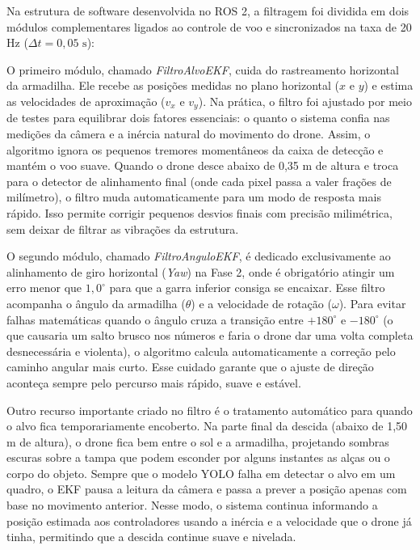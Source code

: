 Na estrutura de software desenvolvida no ROS 2, a filtragem foi dividida em dois módulos complementares ligados ao controle de voo e sincronizados na taxa de 20 Hz ($\Delta t = 0,05\text{ s}$):

O primeiro módulo, chamado \textit{FiltroAlvoEKF}, cuida do rastreamento horizontal da armadilha. Ele recebe as posições medidas no plano horizontal ($x$ e $y$) e estima as velocidades de aproximação ($v_x$ e $v_y$). Na prática, o filtro foi ajustado por meio de testes para equilibrar dois fatores essenciais: o quanto o sistema confia nas medições da câmera e a inércia natural do movimento do drone. Assim, o algoritmo ignora os pequenos tremores momentâneos da caixa de detecção e mantém o voo suave. Quando o drone desce abaixo de 0,35 m de altura e troca para o detector de alinhamento final (onde cada pixel passa a valer frações de milímetro), o filtro muda automaticamente para um modo de resposta mais rápido. Isso permite corrigir pequenos desvios finais com precisão milimétrica, sem deixar de filtrar as vibrações da estrutura.

O segundo módulo, chamado \textit{FiltroAnguloEKF}, é dedicado exclusivamente ao alinhamento de giro horizontal (\textit{Yaw}) na Fase 2, onde é obrigatório atingir um erro menor que $1,0^\circ$ para que a garra inferior consiga se encaixar. Esse filtro acompanha o ângulo da armadilha ($\theta$) e a velocidade de rotação ($\omega$). Para evitar falhas matemáticas quando o ângulo cruza a transição entre $+180^\circ$ e $-180^\circ$ (o que causaria um salto brusco nos números e faria o drone dar uma volta completa desnecessária e violenta), o algoritmo calcula automaticamente a correção pelo caminho angular mais curto. Esse cuidado garante que o ajuste de direção aconteça sempre pelo percurso mais rápido, suave e estável.

Outro recurso importante criado no filtro é o tratamento automático para quando o alvo fica temporariamente encoberto. Na parte final da descida (abaixo de 1,50 m de altura), o drone fica bem entre o sol e a armadilha, projetando sombras escuras sobre a tampa que podem esconder por alguns instantes as alças ou o corpo do objeto. Sempre que o modelo YOLO falha em detectar o alvo em um quadro, o EKF pausa a leitura da câmera e passa a prever a posição apenas com base no movimento anterior. Nesse modo, o sistema continua informando a posição estimada aos controladores usando a inércia e a velocidade que o drone já tinha, permitindo que a descida continue suave e nivelada.

